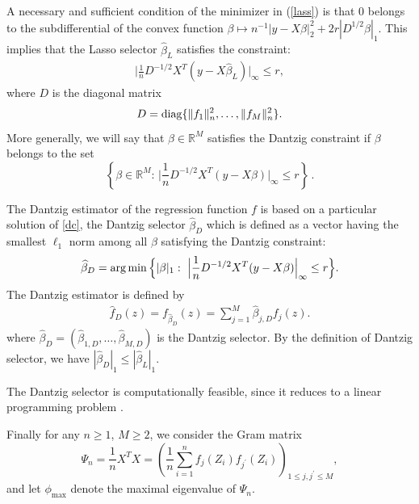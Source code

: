 \documentclass[dvips,aos]{imsart}
\numberwithin{equation}{section}
\theoremstyle{plain}
\def\argmin{\mathop{\mathrm{arg\,min}}}
\def\sf{}
\def\wh{\widehat}
\def\RR{\mathbb R}
\def\argmin{\mathop{\rm arg\, min}}
\begin{document}
A necessary and sufficient condition of the minimizer in
(\ref{lass}) is that 0 belongs to the subdifferential of the convex
function $\beta\mapsto n^{-1}|y-X\beta|_2^2 + 2r|D^{1/2}\beta|_1$.
This implies that the Lasso selector $\widehat \beta_L$ satisfies
the constraint:
\begin{equation}\begin{split}\label{dc}
\Big|\frac{1}{n}D^{-1/2}X^T(y-X\widehat\beta_L)\Big|_\infty \le r,
\end{split}\end{equation}
where $D$ is the diagonal matrix
$$
D = {\rm diag}\{\|f_1\|_n^{2},\dots,\|f_M\|_n^{2}\}.
$$
More generally, we will say that $\beta\in\RR^M$ satisfies the
Dantzig constraint if $\beta$ belongs to the set
$$
\left\{\beta\in\RR^M:\,
\Big|\frac{1}{n}D^{-1/2}X^T(y-X\beta)\Big|_\infty \le r \right\}\,.
$$

The Dantzig estimator of the regression function $f$ is based on a
particular solution of \eqref{dc}, the Dantzig selector
$\wh{\beta}_D$ which is defined as a vector having the smallest
$\ell_1$ norm among all $\beta$ satisfying the Dantzig constraint:
\begin{equation}\begin{split}\label{da2}
\wh{\beta}_D = \argmin\Big\{|\beta|_1: \
\Big|\frac{1}{n}D^{-1/2}X^T(y-X\beta)\Big|_\infty \le r \Big\}.
\end{split}\end{equation}
The Dantzig estimator is defined by
\begin{equation}\begin{split}\label{da1}
\widehat{f}_D(z)={\sf f}_{\wh{\beta}_D}(z) =\sum_{j=1}^M
\wh{\beta}_{j,D} f_j(z).
\end{split}\end{equation}
where $\wh{\beta}_D = (\wh{\beta}_{1,D},\dots,\wh{\beta}_{M,D})$ is
the Dantzig selector. By the definition of Dantzig selector, we have
$|\widehat\beta_D|_1\le |\widehat\beta_L|_1$.



The Dantzig selector is computationally feasible, since it reduces to a
linear programming problem \cite{ct07}.

Finally for any $n\ge 1$, $M\ge2$, we consider the Gram matrix $$ \Psi_{n} =
\frac1n X^TX = \left( \frac1n \sum_{i=1}^n f_j(Z_i) f_{j^\prime}
(Z_i) \right)_{ 1\le j,j^\prime \le M},$$
and let $\phi_{\max}$ denote  the maximal eigenvalue of $\Psi_n$.
\end{document}

